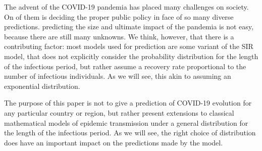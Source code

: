 \documentclass[USenglish,10pt]{article}
\begin{document}
The advent of the COVID-19 pandemia has placed many challenges on society. On of them is deciding the proper public policy in face of so many diverse predictions. predicting the size and ultimate impact of the pandemia is not easy, because there are still many unknowns. We think, however, that there is a contributing factor: most models used for prediction are some variant of the SIR model, that does not explicitly consider the probability distribution for the length of the infectious period, but rather assume a recovery rate proportional to the number of infectious individuals. As we will see, this akin to assuming an exponential distribution.

The purpose of this paper is not to give a prediction of COVID-19 evolution for any particular country or region, but rather present extensions to classical mathematical models of epidemic transmission under a general distribution for the length of the infectious period. As we will see, the right choice of distribution does have an important impact on the predictions made by the model.
\end{document}
